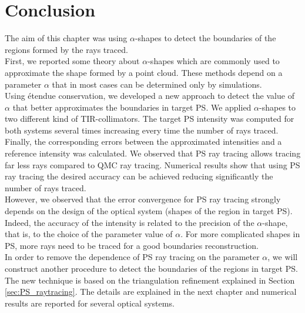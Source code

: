 \section{Conclusion}
The aim of this chapter was using $\alpha$-shapes to detect the boundaries of the regions formed by the rays traced.\\
\indent First, we reported some theory about $\alpha$-shapes which are commonly used to approximate the shape formed by a point cloud. 
These methods depend on a parameter $\alpha$ that in most cases can be determined only by simulations. 
\\ \indent Using \'{e}tendue conservation, we developed a new approach to detect the value of $\alpha$ that better approximates the boundaries in target PS. 
We applied $\alpha$-shapes to two different kind of TIR-collimators. The target PS intensity was computed for both systems several times increasing every time the number of rays traced. Finally, the corresponding errors between the approximated intensities and a reference intensity was calculated. We observed that PS ray tracing allows tracing far less rays compared to QMC ray tracing. Numerical results show that using PS ray tracing the desired accuracy can be achieved reducing significantly the number of rays traced.\\ \indent 
However, we observed that the error convergence for PS ray tracing strongly depends on the design of the optical system (shapes of the region in target PS). Indeed, the accuracy of the intensity is related to the precision of the $\alpha$-shape, that is, to the choice of the parameter value of $\alpha$. For more complicated shapes in PS, more rays need to be traced for a good boundaries reconstruction.\\ \indent
In order to remove the dependence of PS ray tracing on the parameter $\alpha$, we will construct another procedure to detect the boundaries of the regions in target PS. 
The new technique is based on the triangulation refinement explained in Section \ref{sec:PS_raytracing}. The details are explained in the next chapter and numerical results are reported for several optical systems. 











































